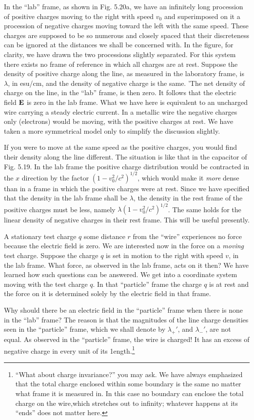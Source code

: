 In the ``lab'' frame, as shown in Fig. 5.20a, we have an infinitely
long procession of positive charges moving to the right with speed $v_0$
and superimposed on it a procession of negative charges moving
toward the left with the same speed. These charges are supposed to
be so numerous and closely spaced that their discreteness can be
ignored at the distances we shall be concerned with. In the figure, for
clarity, we have drawn the two processions slightly separated. For
this system there exists no frame of reference in which all charges
are at rest. Suppose the density of positive charge along the line,
as measured in the laboratory frame, is $\lambda$, in esu/cm, and the density
of negative charge is the same. 'The net density of charge on the line,
in the ``lab'' frame, is then zero. It follows that the electric field $\mathbf{E}$
is zero in the lab frame. What we have here is equivalent to an uncharged
wire carrying a steady electric current. In a metallic wire
the negative charges only (electrons) would be moving, with the positive
charges at rest. We have taken a more symmetrical model only
to simplify the discussion slightly.

If you were to move at the same speed as the positive charges, you
would find their density along the line different. The situation is like
that in the capacitor of Fig. 5.19. In the lab frame the positive charge
distribution would be contracted in the $x$ direction by the factor
$(1-v_0^2/c^2)^{1/2}$, which would make it \emph{more} dense than in a frame in
which the positive charges were at rest. Since we have specified that
the density in the lab frame shall be $\lambda$, the density in the rest frame of
the positive charges must be less, namely $\lambda(1-v_0^2/c^2)^{1/2}$. The
same holds for the linear density of negative charges in their rest
frame. This will be useful presently.

A stationary test charge $q$ some distance $r$ from the ``wire'' experiences
no force because the electric field is zero. We are interested
now in the force on a \emph{moving} test charge. Suppose the charge $q$ is set
in motion to the right with speed $v$, in the lab frame. What force, as
observed in the lab frame, acts on it then? We have learned how such
questions can be answered. We get into a coordinate system moving
with the test charge $q$. In that ``particle'' frame the charge $q$ is at
rest and the force on it is determined solely by the electric field in
that frame.

Why should there be an electric field in the ``particle'' frame when
there is none in the ``lab'' frame? The reason is that the magnitudes
of the line charge densities seen in the ``particle'' frame, which we
shall denote by $\lambda_+'$, and $\lambda_-'$, are not equal. As observed
in the ``particle'' frame, the wire is charged! It has an excess of negative
charge in every unit of its
1ength.\footnote{``What about charge invariance?'' you may ask.
We have always emphasized that
the total charge enclosed within some boundary is the same no matter what frame it is
measured in. In this case no boundary can enclose the total charge on the wire,which
stretches out to infinity; whatever happens at its ``ends'' does not matter here.}


